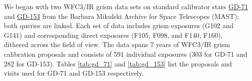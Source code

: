 \documentclass[12pt]{article}
\begin{document}
{{    We began with two WFC3/IR grism data sets on standard calibrator stars
    \href{http://archive.stsci.edu/hst/search.php?action=Search&sci_instrume=WFC3&sci_targname=GD-71&sci_pep_id=11552,11926,11936,12333,12357,12702,13092,13579,14024,14386&sci_aper_1234=IR,G*}{
        \color{blue} GD-71} and
    \href{http://archive.stsci.edu/hst/search.php?action=Search&sci_instrume=WFC3&sci_targname=GD-153&sci_pep_id=11552,11926,11936,12333,12357,12702,13092,13579,14024,14386&sci_aper_1234=IR,G*}{
        \color{blue} GD-153} from the 
Barbara Mikulski Archive for Space Telescopes (MAST); both queries are linked. Each set of 
data includes grism exposures (G102 and G141) and corresponding direct exposures (F105, F098, and F140, F160), 
dithered across the field of view. The data spans 7 years of WFC3/IR grism calibration proposals and consists of 
591 individual exposures (303 for GD-71 and 282 for GD-153). Tables \ref{tab:gd_71} and \ref{tab:gd_153} list the proposals and visits
used for GD-71 and GD-153 respectively. 


}}
\end{document}
